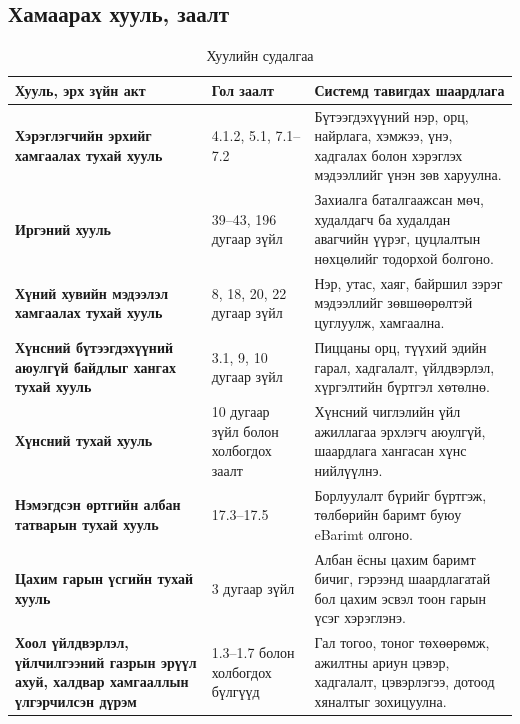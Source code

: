 \subsection{Хамаарах хууль, заалт}
\begin{table}
    \centering
    \begin{tabular}{p{4cm}p{4.5cm}p{5.5cm}}
\toprule
\textbf{Хууль, эрх зүйн акт} &
\textbf{Гол заалт} &
\textbf{Системд тавигдах шаардлага} \\
\midrule

\textbf{Хэрэглэгчийн эрхийг хамгаалах тухай хууль} &
4.1.2, 5.1, 7.1--7.2 &
Бүтээгдэхүүний нэр, орц, найрлага, хэмжээ, үнэ, хадгалах болон
хэрэглэх мэдээллийг үнэн зөв харуулна. \\

\textbf{Иргэний хууль} &
39--43, 196 дугаар зүйл &
Захиалга баталгаажсан мөч, худалдагч ба худалдан авагчийн үүрэг,
цуцлалтын нөхцөлийг тодорхой болгоно. \\

\textbf{Хүний хувийн мэдээлэл хамгаалах тухай хууль} &
8, 18, 20, 22 дугаар зүйл &
Нэр, утас, хаяг, байршил зэрэг мэдээллийг зөвшөөрөлтэй цуглуулж,
хамгаална. \\

\textbf{Хүнсний бүтээгдэхүүний аюулгүй байдлыг хангах тухай хууль} &
3.1, 9, 10 дугаар зүйл &
Пиццаны орц, түүхий эдийн гарал, хадгалалт, үйлдвэрлэл, хүргэлтийн
бүртгэл хөтөлнө. \\

\textbf{Хүнсний тухай хууль} &
10 дугаар зүйл болон холбогдох заалт &
Хүнсний чиглэлийн үйл ажиллагаа эрхлэгч аюулгүй, шаардлага хангасан
хүнс нийлүүлнэ. \\

\textbf{Нэмэгдсэн өртгийн албан татварын тухай хууль} &
17.3--17.5 &
Борлуулалт бүрийг бүртгэж, төлбөрийн баримт буюу eBarimt олгоно. \\

\textbf{Цахим гарын үсгийн тухай хууль} &
3 дугаар зүйл &
Албан ёсны цахим баримт бичиг, гэрээнд шаардлагатай бол цахим эсвэл
тоон гарын үсэг хэрэглэнэ. \\

\textbf{Хоол үйлдвэрлэл, үйлчилгээний газрын эрүүл ахуй, халдвар
хамгааллын үлгэрчилсэн дүрэм} &
1.3--1.7 болон холбогдох бүлгүүд &
Гал тогоо, тоног төхөөрөмж, ажилтны ариун цэвэр, хадгалалт,
цэвэрлэгээ, дотоод хяналтыг зохицуулна. \\

\bottomrule
        
    \end{tabular}
    \caption{Хуулийн судалгаа}
    \label{tab:placeholder}
\end{table}

